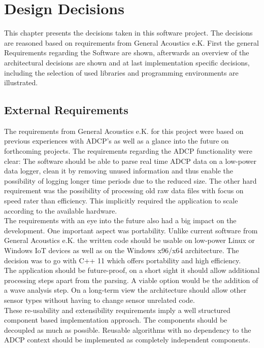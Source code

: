 
\chapter{Design Decisions}
This chapter presents the decisions taken in this software project. The decisions are reasoned based on requirements from General Acoustics e.K. First the general Requirements regarding the Software are shown, afterwards an overview of the architectural decisions are shown and at last implementation specific decisions, including the selection of used libraries and programming environments are illustrated. 
\section{External Requirements}
The requirements from General Acoustics e.K. for this project were based on previous experiences with ADCP's as well as a glance into the future on forthcoming projects. The requirements regarding the ADCP functionality were clear: The software should be able to parse real time ADCP data on a low-power data logger, clean it by removing unused information and thus enable the possibility of logging longer time periods due to the reduced size. The other hard requirement was the possibility of processing old raw data files with focus on speed rater than efficiency. This implicitly required the application to scale according to the available hardware.\\ The requirements with an eye into the future also had a big impact on the development. One important aspect was portability. Unlike current software from General Acoustics e.K. the written code should be usable on low-power Linux or Windows IoT devices as well as on the Windows x96/x64 architecture. The decision was to go with C++ 11 which offers portability and high efficiency.\\
The application should be future-proof, on a short sight it should allow additional processing steps apart from the parsing. A viable option would be the addition of a wave analysis step. On a long-term view the architecture should allow other sensor types without having to change sensor unrelated code.\\ 
These re-usability and extensibility requirements imply a well structured component based implementation approach. The components should be decoupled as much as possible. Reusable algorithms with no dependency to the ADCP context should be implemented as completely independent components.\\
